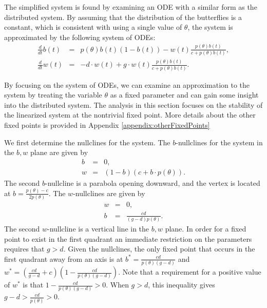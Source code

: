 \documentclass[review]{elsarticle}
\begin{document}
The simplified system is found by examining an ODE with a similar form
as the distributed system. By assuming that the distribution of the
butterflies is a constant, which is consistent with using a single
value of $\theta$, the system is approximated by the following system
of ODEs:
\begin{eqnarray}
  \label{eq:scaledODE1}
  \frac{d}{dt} b(t) & = &
      p(\theta) b(t) (1 - b(t))
      -  w(t) \frac{p(\theta) b(t)}{c+p(\theta)b(t)}, \\
  \label{eq:scaledODE2}
  \frac{d}{dt} w(t) & = & -d \cdot w(t) +
       g \cdot w(t) \frac{p(\theta) b(t) }{c + p(\theta) b(t)}.
\end{eqnarray}

By focusing on the system of ODEs, we can examine an approximation to
the system by treating the variable $\theta$ as a fixed parameter and
can gain some insight into the distributed system. The analysis in
this section focuses on the stability of the linearized system at the
nontrivial fixed point. More details about the other fixed points is
provided in Appendix \ref{appendix:otherFixedPoints}

We first determine the nullclines for the system.
The $b$-nullclines for the system in the $b,w$ plane are given by
\begin{eqnarray}
  \label{eq:bnullclines}
  b & = & 0, \\
  w & = & (1-b)(c+b\cdot p(\theta)).
\end{eqnarray}
The second $b$-nullcline is a parabola opening downward, and the vertex is located at
$b=\frac{p(\theta)-c}{2p(\theta)}$. The $w$-nullclines are given by
\begin{eqnarray}
  \label{eq:wnullclines}
  w & = & 0, \\
  b & = & \frac{cd}{(g-d)p(\theta)}.
\end{eqnarray}
The second $w$-nullcline is a vertical line in the $b,w$ plane. In
order for a fixed point to exist in the first quadrant an immediate
restriction on the parameters requires that $g>d$.  Given the
nullclines, the only fixed point that occurs in the first quadrant
away from an axis is at $b^*=\frac{cd}{p(\theta)(g-d)}$ and
$w^*=\left(\frac{cd}{g-d}+c\right)\left(1-\frac{cd}{p(\theta)(g-d)}\right)$.
Note that a requirement for a positive value of $w^*$ is that
$1-\frac{cd}{p(\theta)(g-d)}>0$.  When $g>d$, this inequality gives $g-d >\frac{cd}{p(\theta)} >0$.
\end{document}
